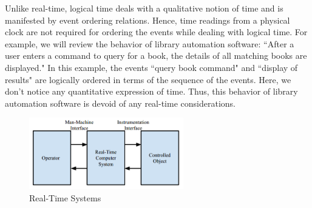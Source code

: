 \documentclass[12pt]{report}
\begin{document}
Unlike real-time, logical time deals with a qualitative notion of time and is manifested by event ordering relations. Hence, time readings from a physical clock are not required for ordering the events while dealing with logical time. For example, we will review the behavior of library automation software: ``After a user enters a command to query for a book, the details of all matching books are displayed." In this example, the events  ``query book command" and ``display of results" are logically ordered in terms of the sequence of the events. Here, we don't notice any quantitative expression of time. Thus, this behavior of library automation software is devoid of any real-time considerations.

\begin{figure}[h]
    \centering
    \includegraphics[width=0.6\textwidth]{images/real-time-sys.png}
    \caption{Real-Time Systems}
    \label{fig:rts}
\end{figure}
\end{document}
